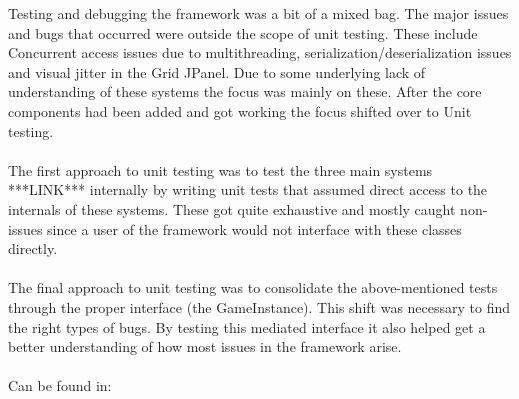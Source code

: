 \documentclass[]{article}
\date{}
\begin{document}
Testing and debugging the framework was a bit of a mixed bag. The major
issues and bugs that occurred were outside the scope of unit testing.
These include Concurrent access issues due to multithreading,
serialization/deserialization issues and visual jitter in the Grid
JPanel. Due to some underlying lack of understanding of these systems
the focus was mainly on these. After the core components had been added
and got working the focus shifted over to Unit testing.
\\ \\
The first approach to unit testing was to test the three main systems
***LINK*** internally by writing unit tests that assumed direct access
to the internals of these systems. These got quite exhaustive and mostly
caught non-issues since a user of the framework would not interface with
these classes directly.
\\ \\
The final approach to unit testing was to consolidate the
above-mentioned tests through the proper interface (the GameInstance).
This shift was necessary to find the right types of bugs. By testing
this mediated interface it also helped get a better understanding of how
most issues in the framework arise.
\\ \\
Can be found in:
\end{document}
